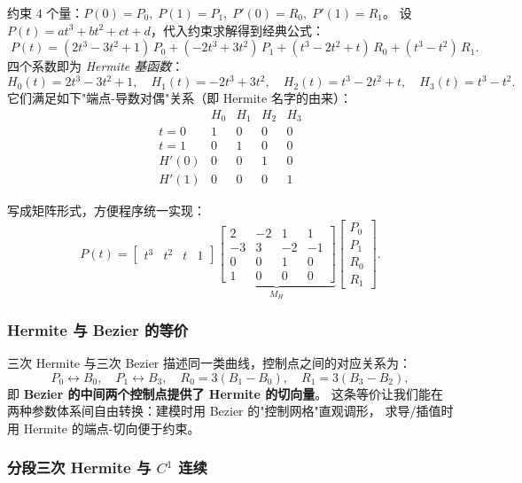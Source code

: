 \documentclass[a4paper,12pt]{ctexart}
\begin{document}
约束 $4$ 个量：$P(0)=P_0,\;P(1)=P_1,\;P'(0)=R_0,\;P'(1)=R_1$。
设 $P(t)=at^3+bt^2+ct+d$，代入约束求解得到经典公式：
\[
\boxed{\;
    P(t) = (2t^3 - 3t^2 + 1)\,P_0
        + (-2t^3 + 3t^2)\,P_1
        + (t^3 - 2t^2 + t)\,R_0
        + (t^3 - t^2)\,R_1 .\;}
\]
四个系数即为 \emph{Hermite 基函数}：
\[
    H_0(t) = 2t^3-3t^2+1,\quad
    H_1(t) = -2t^3+3t^2,\quad
    H_2(t) = t^3-2t^2+t,\quad
    H_3(t) = t^3-t^2.
\]
它们满足如下"端点-导数对偶"关系（即 Hermite 名字的由来）：
\[
\begin{array}{c|cccc}
        & H_0 & H_1 & H_2 & H_3 \\\hline
   t=0  & 1   & 0   & 0   & 0   \\
   t=1  & 0   & 1   & 0   & 0   \\
   H'(0)& 0   & 0   & 1   & 0   \\
   H'(1)& 0   & 0   & 0   & 1
\end{array}
\]

写成矩阵形式，方便程序统一实现：
\[
    P(t) =
    \begin{bmatrix} t^3 & t^2 & t & 1 \end{bmatrix}
    \underbrace{\begin{bmatrix}
        2 & -2 &  1 &  1 \\
       -3 &  3 & -2 & -1 \\
        0 &  0 &  1 &  0 \\
        1 &  0 &  0 &  0
    \end{bmatrix}}_{\displaystyle M_H}
    \begin{bmatrix} P_0 \\ P_1 \\ R_0 \\ R_1 \end{bmatrix}.
\]

\subsubsection{Hermite 与 Bezier 的等价}

三次 Hermite 与三次 Bezier 描述同一类曲线，控制点之间的对应关系为：
\[
    P_0 \leftrightarrow B_0,\quad
    P_1 \leftrightarrow B_3,\quad
    R_0 = 3(B_1-B_0),\quad
    R_1 = 3(B_3-B_2),
\]
即\textbf{ Bezier 的中间两个控制点提供了 Hermite 的切向量}。
这条等价让我们能在两种参数体系间自由转换：建模时用 Bezier 的"控制网格"直观调形，
求导/插值时用 Hermite 的端点-切向便于约束。

\subsubsection{分段三次 Hermite 与 $C^1$ 连续}
\end{document}
